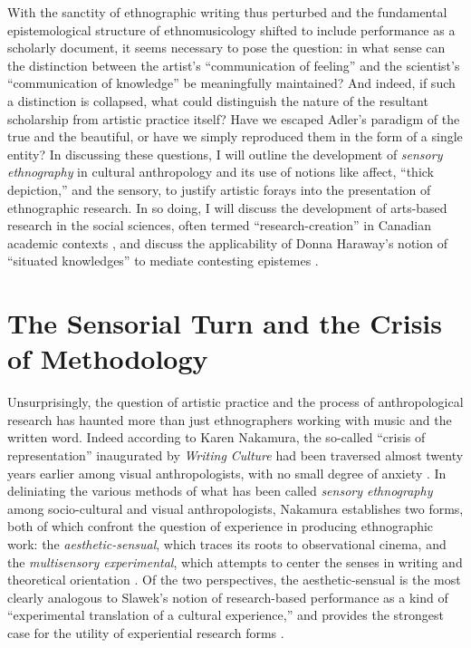 With the sanctity of ethnographic writing thus perturbed and the
fundamental epistemological structure of ethnomusicology shifted to
include performance as a scholarly document, it seems necessary to pose
the question: in what sense can the distinction between the artist's
``communication of feeling'' and the scientist's ``communication of
knowledge'' be meaningfully maintained? And indeed, if such a
distinction is collapsed, what could distinguish the nature of the
resultant scholarship from artistic practice itself? Have we escaped
Adler's paradigm of the true and the beautiful, or have we simply
reproduced them in the form of a single entity? In discussing these
questions, I will outline the development of \emph{sensory ethnography}
in cultural anthropology and its use of notions like affect, ``thick
depiction,'' and the sensory, to justify artistic forays into the
presentation of ethnographic research. In so doing, I will discuss the
development of arts-based research in the social sciences, often termed
``research-creation'' in Canadian academic contexts
\autocite{chapman_research-creation:_2012}, and discuss the
applicability of Donna Haraway's notion of ``situated knowledges'' to
mediate contesting epistemes \autocite*{haraway_situated_1988}.

\hypertarget{the-sensorial-turn-and-the-crisis-of-methodology}{%
\section{The Sensorial Turn and the Crisis of
Methodology}\label{the-sensorial-turn-and-the-crisis-of-methodology}}

Unsurprisingly, the question of artistic practice and the process of
anthropological research has haunted more than just ethnographers
working with music and the written word. Indeed according to Karen
Nakamura, the so-called ``crisis of representation'' inaugurated by
\emph{Writing Culture} had been traversed almost twenty years earlier
among visual anthropologists, with no small degree of anxiety
\autocite*[133]{nakamura_making_2013}. In deliniating the various
methods of what has been called \emph{sensory ethnography} among
socio-cultural and visual anthropologists, Nakamura establishes two
forms, both of which confront the question of experience in producing
ethnographic work: the \emph{aesthetic-sensual}, which traces its roots
to observational cinema, and the \emph{multisensory experimental}, which
attempts to center the senses in writing and theoretical orientation
\autocite*[133-135]{nakamura_making_2013}. Of the two perspectives, the
aesthetic-sensual is the most clearly analogous to Slawek's notion of
research-based performance as a kind of ``experimental translation of a
cultural experience,'' and provides the strongest case for the utility
of experiential research forms \autocite*[22]{slawek_study_1994}.

